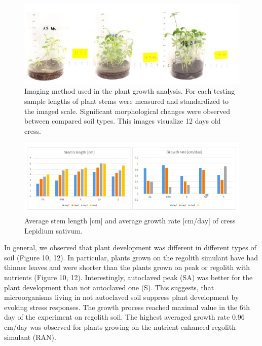 \documentclass[preprint]{elsarticle}
\begin{document}
\begin{figure}
\centering
\includegraphics{img/figure10.png}
\caption{Imaging method used in the plant growth analysis. For each testing sample lengths of plant stems were measured and standardized to the imaged scale. Significant morphological changes were observed between compared soil types. This images visualize 12 days old cress.}
\end{figure}

\begin{figure}
\centering
\includegraphics{img/figure11.png}
\caption{Average stem length [cm] and average growth rate [cm/day] of cress Lepidium sativum.}
\end{figure}

In general, we observed that plant development was different in different types of soil (Figure 10, 12). In particular, plants grown on the regolith simulant have had thinner leaves and were shorter than the plants grown on peak or regolith with nutrients (Figure 10, 12). Interestingly, autoclaved peak (SA) was better for the plant development than not autoclaved one (S). This suggests, that microorganisms living in not autoclaved soil suppress plant development by evoking stress responses. The growth process reached maximal value in the 6th day of the experiment on regolith soil. The highest averaged growth rate 0.96 cm/day was observed for plants growing on the nutrient-enhanced regolith simulant (RAN).
\end{document}
